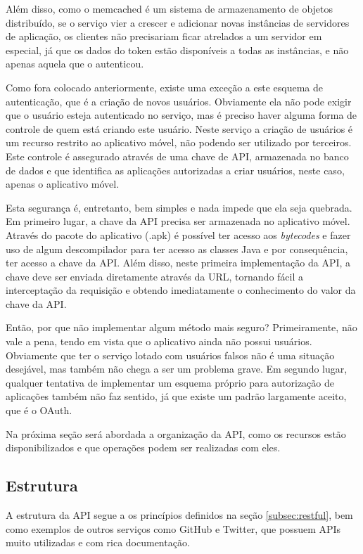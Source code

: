 \documentclass[diss]{template/setrem}
\begin{document}
Além disso, como o memcached é um sistema de armazenamento de objetos distribuído, se o serviço vier a crescer e adicionar novas instâncias de servidores de aplicação, os clientes não precisariam ficar atrelados a um servidor em especial, já que os dados do token estão disponíveis a todas as instâncias, e não apenas aquela que o autenticou.

Como fora colocado anteriormente, existe uma exceção a este esquema de autenticação, que é a criação de novos usuários. Obviamente ela não pode exigir que o usuário esteja autenticado no serviço, mas é preciso haver alguma forma de controle de quem está criando este usuário. Neste serviço a criação de usuários é um recurso restrito ao aplicativo móvel, não podendo ser utilizado por terceiros. Este controle é assegurado através de uma chave de API, armazenada no banco de dados e que identifica as aplicações autorizadas a criar usuários, neste caso, apenas o aplicativo móvel.

Esta segurança é, entretanto, bem simples e nada impede que ela seja quebrada. Em primeiro lugar, a chave da API precisa ser armazenada no aplicativo móvel. Através do pacote do aplicativo (.apk) é possível ter acesso aos \emph{bytecodes} e fazer uso de algum descompilador para ter acesso as classes Java e por consequência, ter acesso a chave da API. Além disso, neste primeira implementação da API, a chave deve ser enviada diretamente através da URL, tornando fácil a interceptação da requisição e obtendo imediatamente o conhecimento do valor da chave da API.

Então, por que não implementar algum método mais seguro? Primeiramente, não vale a pena, tendo em vista que o aplicativo ainda não possui usuários. Obviamente que ter o serviço lotado com usuários falsos não é uma situação desejável, mas também não chega a ser um problema grave. Em segundo lugar, qualquer tentativa de implementar um esquema próprio para autorização de aplicações também não faz sentido, já que existe um padrão largamente aceito, que é o OAuth.

Na próxima seção será abordada a organização da API, como os recursos estão disponibilizados e que operações podem ser realizadas com eles.

\subsection{Estrutura}
\label{subsec:api-estrutura}
A estrutura da API segue a os princípios definidos na seção \ref{subsec:restful}, bem como exemplos de outros serviços como GitHub e Twitter, que possuem APIs muito utilizadas e com rica documentação.
\end{document}
